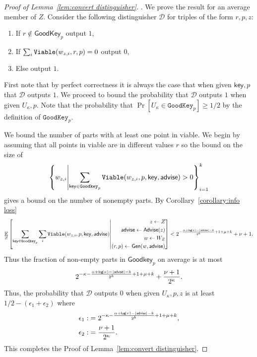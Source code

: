 \begin{proof}[Proof of Lemma~\ref{lem:convert distinguisher}].
We prove the result for an average member of $Z$.  Consider the following distinguisher $\mathcal{D}$ for triples of the form $r, p, z$:
\begin{enumerate}
\item If $r \not\in \mathsf{GoodKey}_p$ output $1$,
\item If $\sum_{i} \mathtt{Viable}(w_{z, i}, r, p) =0 $ output $0$,
\item Else output $1$.
\end{enumerate}
First note that by perfect correctness it is always the case that when given $\mathsf{key}, p$ that $\mathcal{D}$ outputs $1$.  We proceed to bound the probability that $\mathcal{D}$ outputs $1$ when given $U_\kappa, p$.  Note that the probability that $\Pr[U_\kappa \in \mathtt{GoodKey}_p] \ge 1/2$ by the definition of $\mathtt{GoodKey}_p$. 

We bound the number of parts with at least one point in viable.  We begin by assuming that all points in viable are in different  values $r$ so the bound on the size of 
\[
\left\{w_{z, i} \middle|\sum_{\mathsf{key}\in\mathtt{Goodkey}_p} \mathtt{Viable}(w_{z,i}, p, \mathsf{key}, {\mathsf{advise}})>0\right\}_{i=1}^k 
\] 
gives a bound on the number of nonempty parts. By Corollary~\ref{corollary:info loss} 
\[
\operatorname*{\mathbb{E}}_{Z} \left[\sum_{\mathsf{key} \in \mathtt{Goodkey}_p}\sum_{i }  \mathtt{Viable}(w_{z,i}, p, \mathsf{key}, {\mathsf{advise}}) \middle| \begin{aligned} z\leftarrow Z\\ {\mathsf{advise}}\leftarrow {\ensuremath{\mathsf{Advise}}}(z)\\w\leftarrow W_Z\\(r, p)\leftarrow {\ensuremath{\mathsf{Gen}}}(w, {\mathsf{advise}})\end{aligned} \right]< 2^{-\frac{\alpha+\mathsf{log}\!\left(\nu\right)-|{\mathsf{advise}}|-k}{2^k}+1+\mu+k}+\nu+1.
\]
Thus the fraction of non-empty parts in $\mathsf{Goodkey}_p$ on average is at most 
\[
2^{-\kappa-\frac{\alpha+\mathsf{log}\!\left(\nu\right)-|{\mathsf{advise}}|-k}{2^k}+1+\mu+k}+\frac{\nu+1}{2^\kappa}.
\]
Thus, the probability that $\mathcal{D}$ outputs $0$ when given $U_\kappa, p, z$ is at least 
$1/2-(\epsilon_1+\epsilon_2)$
where 
\begin{align*}
\epsilon_1:&=2^{-\kappa-\frac{\alpha+\mathsf{log}\!\left(\nu\right)-|{\mathsf{advise}}|-k}{2^k}+1+\mu+k},\\
\epsilon_2:&=\frac{\nu+1}{2^{\kappa}}.
\end{align*}
\noindent
This completes the Proof of Lemma~\ref{lem:convert distinguisher}.
\end{proof}


